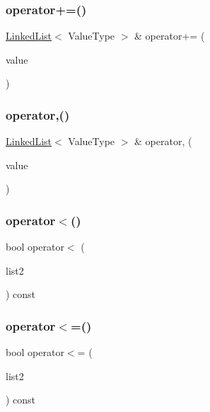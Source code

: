 \subsubsection{\texorpdfstring{operator+=()}{operator+=()}\hspace{0.1cm}{\footnotesize\ttfamily [3/3]}}
{\footnotesize\ttfamily \mbox{\hyperlink{classLinkedList}{Linked\+List}}$<$ Value\+Type $>$ \& operator+= (\begin{DoxyParamCaption}\item[{const Value\+Type \&}]{value }\end{DoxyParamCaption})}

\mbox{\label{classLinkedList_a01622233116ad1ae4333e3e1ed1f7ca5}} 
\subsubsection{\texorpdfstring{operator,()}{operator,()}}
{\footnotesize\ttfamily \mbox{\hyperlink{classLinkedList}{Linked\+List}}$<$ Value\+Type $>$ \& operator, (\begin{DoxyParamCaption}\item[{const Value\+Type \&}]{value }\end{DoxyParamCaption})}

\mbox{\label{classLinkedList_a1622208b00e2ffcf2ad120c1d748c784}} 
\subsubsection{\texorpdfstring{operator$<$()}{operator<()}}
{\footnotesize\ttfamily bool operator$<$ (\begin{DoxyParamCaption}\item[{const \mbox{\hyperlink{classLinkedList}{Linked\+List}}$<$ Value\+Type $>$ \&}]{list2 }\end{DoxyParamCaption}) const}

\mbox{\label{classLinkedList_ac25ce8222d0af74f8052d4106ec83cd0}} 
\subsubsection{\texorpdfstring{operator$<$=()}{operator<=()}}
{\footnotesize\ttfamily bool operator$<$= (\begin{DoxyParamCaption}\item[{const \mbox{\hyperlink{classLinkedList}{Linked\+List}}$<$ Value\+Type $>$ \&}]{list2 }\end{DoxyParamCaption}) const}


